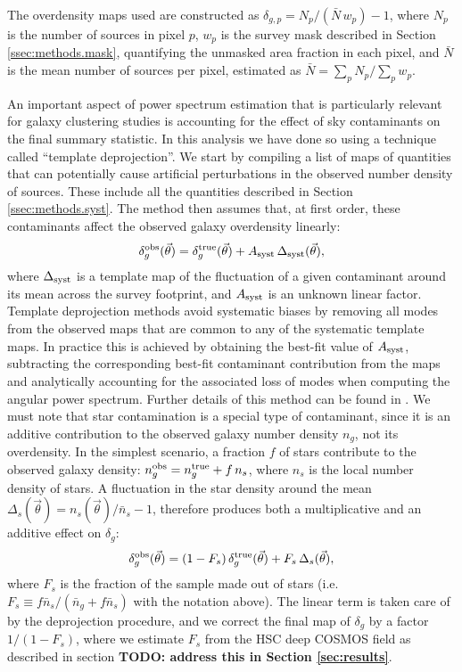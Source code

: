 \documentclass[a4paper,11pt]{article}
\newcommand{\nv}{\vec{\theta}}
\newcommand{\todo}[1]{{\bf TODO: #1}}
\begin{document}
    The overdensity maps used are constructed as $\delta_{g,p}=N_p/(\bar{N}\,w_p)-1$, where $N_p$ is the number of sources in pixel $p$, $w_p$ is the survey mask described in Section \ref{ssec:methods.mask}, quantifying the unmasked area fraction in each pixel, and $\bar{N}$ is the mean number of sources per pixel, estimated as $\bar{N}=\sum_p N_p/\sum_p w_p$.
    
    An important aspect of power spectrum estimation that is particularly relevant for galaxy clustering studies is accounting for the effect of sky contaminants on the final summary statistic. In this analysis we have done so using a technique called ``template deprojection''. We start by compiling a list of maps of quantities that can potentially cause artificial perturbations in the observed number density of sources. These include all the quantities described in Section \ref{ssec:methods.syst}. The method then assumes that, at first order, these contaminants affect the observed galaxy overdensity linearly:
    \begin{equation}
      \delta_g^{\rm obs}(\nv) = \delta_g^{\rm true}(\nv) + A_{\rm syst}\,\Delta_{\rm syst}(\nv),
    \end{equation}
    where $\Delta_{\rm syst}$ is a template map of the fluctuation of a given contaminant around its mean across the survey footprint, and $A_{\rm syst}$ is an unknown linear factor. Template deprojection methods avoid systematic biases by  removing all modes from the observed maps that are common to any of the systematic template maps. In practice this is achieved by obtaining the best-fit value of $A_{\rm syst}$, subtracting the corresponding best-fit contaminant contribution from the maps and analytically accounting for the associated loss of modes when computing the angular power spectrum. Further details of this method can be found in \cite{2017MNRAS.465.1847E,2019MNRAS.484.4127A} . We must note that star contamination is a special type of contaminant, since it is an additive contribution to the observed galaxy number density $n_g$, not its overdensity. In the simplest scenario, a fraction $f$ of stars contribute to the observed galaxy density: $n_g^{\rm obs}=n^{\rm true}_g+f\,n_s$, where $n_s$ is the local number density of stars. A fluctuation in the star density around the mean $\Delta_s(\nv)=n_s(\nv)/\bar{n}_s-1$, therefore produces both a multiplicative and an additive effect on $\delta_g$:
    \begin{equation}
      \delta_g^{\rm obs}(\nv) = (1-F_s)\,\delta_g^{\rm true}(\nv)+F_s\,\Delta_s(\nv),
    \end{equation}
    where $F_s$ is the fraction of the sample made out of stars (i.e. $F_s\equiv f\bar{n}_s/(\bar{n}_g+f\bar{n}_s)$ with the notation above). The linear term is taken care of by the deprojection procedure, and we correct the final map of $\delta_g$ by a factor $1/(1-F_s)$, where we estimate $F_s$ from the HSC deep COSMOS field as described in section \todo{address this in Section \ref{sec:results}}.
    
\end{document}
